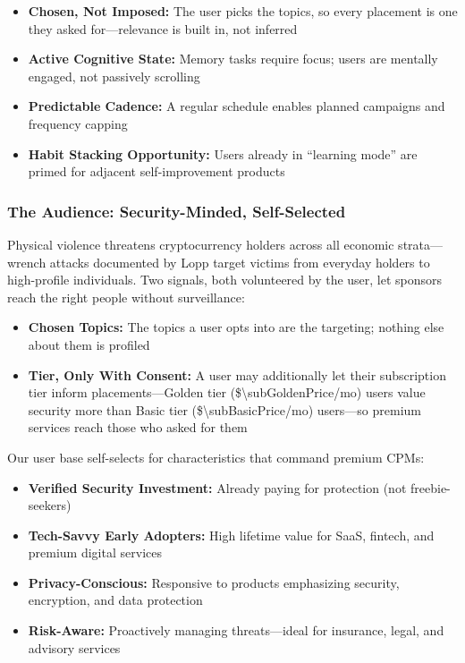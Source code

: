 \begin{itemize}
  \item \textbf{Chosen, Not Imposed:} The user picks the topics, so every placement is one they asked for---relevance is built in, not inferred
  \item \textbf{Active Cognitive State:} Memory tasks require focus; users are mentally engaged, not passively scrolling
  \item \textbf{Predictable Cadence:} A regular schedule enables planned campaigns and frequency capping
  \item \textbf{Habit Stacking Opportunity:} Users already in ``learning mode'' are primed for adjacent self-improvement products \cite{clear2018}
\end{itemize}

\subsubsection{The Audience: Security-Minded, Self-Selected}

Physical violence threatens cryptocurrency holders across all economic strata---wrench attacks documented by Lopp \cite{lopp2024} target victims from everyday holders to high-profile individuals. Two signals, both volunteered by the user, let sponsors reach the right people without surveillance:

\begin{itemize}
  \item \textbf{Chosen Topics:} The topics a user opts into are the targeting; nothing else about them is profiled
  \item \textbf{Tier, Only With Consent:} A user may additionally let their subscription tier inform placements---Golden tier (\$\num{\subGoldenPrice}/mo) users value security more than Basic tier (\$\num{\subBasicPrice}/mo) users---so premium services reach those who asked for them
\end{itemize}

\noindent Our user base self-selects for characteristics that command premium CPMs:

\begin{itemize}
  \item \textbf{Verified Security Investment:} Already paying for protection (not freebie-seekers)
  \item \textbf{Tech-Savvy Early Adopters:} High lifetime value for SaaS, fintech, and premium digital services
  \item \textbf{Privacy-Conscious:} Responsive to products emphasizing security, encryption, and data protection
  \item \textbf{Risk-Aware:} Proactively managing threats---ideal for insurance, legal, and advisory services
\end{itemize}

